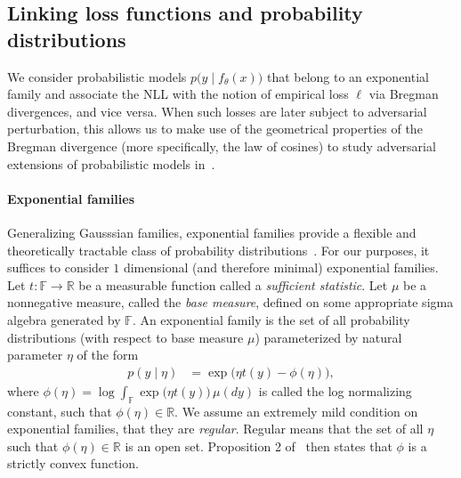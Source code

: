 \subsection{Linking loss functions and probability distributions}
We consider probabilistic models $p\big(y \mid f_\theta(x) \big)$ that belong to an exponential family
and associate the NLL with the notion of empirical loss $\ell$ via Bregman divergences, and vice versa.
When such losses are later subject to adversarial perturbation, this allows us to make use of the geometrical properties of the Bregman divergence (more specifically, the law of cosines) to study adversarial extensions of probabilistic models in~.


\paragraph{Exponential families} Generalizing Gausssian families, exponential families provide a flexible and theoretically tractable class of probability distributions~\citep[\S~6.6.3]{deisenroth20mathml}. 
For our purposes, it suffices to consider $1$ dimensional (and therefore minimal) exponential families.
Let $t:\mathbb{F} \to \mathbb{R}$ be a measurable function called a \emph{sufficient statistic}.
Let $\mu$ be a nonnegative measure, called the \emph{base measure}, defined on some appropriate sigma algebra generated by $\mathbb{F}$.
An exponential family is the set of all probability distributions (with respect to base measure $\mu$) parameterized by natural parameter $\eta$ of the form
\begin{align*}
    p(y \mid \eta) &= \exp\big( \eta t(y) - \phi(\eta) \big),
\end{align*}
where $\phi(\eta) = \log \int_{\mathbb{F}} \exp\big( \eta t(y) \big) \, \mu(dy)$ is called the log normalizing constant, such that $\phi(\eta) \in \mathbb{R}$.
We assume an extremely mild condition on exponential families, that they are \emph{regular}.
Regular means that the set of all $\eta$ such that $\phi(\eta) \in \mathbb{R}$ is an open set.
Proposition 2 of~\citet{wainwright2008graphical} then states that $\phi$ is a strictly convex function.


